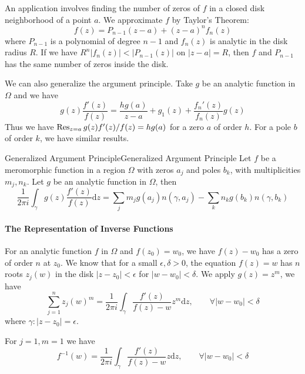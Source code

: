 \documentclass[../main.tex]{subfiles}
\begin{document}
An application involves finding the number of zeros of $f$ in a closed disk neighborhood of a point $a$. We approximate $f$ by Taylor's Theorem:
\begin{equation*}
	f(z) = P_{n-1}(z-a) + (z-a)^nf_n(z)
\end{equation*}
where $P_{n-1}$ is a polynomial of degree $n-1$ and $f_n(z)$ is analytic in the disk radius $R$. If we have $R^n \left|f_n(z)\right| < \left|P_{n-1}(z)\right|$ on $\left|z-a\right| = R$, then $f$ and $P_{n-1}$ has the same number of zeros inside the disk.

We can also generalize the argument principle. Take $g$ be an analytic function in $\Omega$ and we have
\begin{equation*}
	g(z) \frac{f'(z)}{f(z)} = \frac{hg(a)}{z-a} + g_1(z) + \frac{f_n'(z)}{f_n(z)}g(z)
\end{equation*}
Thus we have $\operatorname{Res}_{z=a} g(z) f'(z) / f(z) = hg(a)$ for a zero $a$ of order $h$. For a pole $b$ of order $k$, we have similar results.

\begin{theorem}{Generalized Argument Principle}{Generalized Argument Principle}
	Let $f$ be a meromorphic function in a region $\Omega$ with zeros $a_j$ and poles $b_k$, with multiplicities $m_j,n_k$. Let $g$ be an analytic function in $\Omega$, then
	\begin{equation}
		\frac{1}{2 \pi i} \int_{\gamma} g(z) \frac{f'(z)}{f(z)} \mathrm{d} z = \sum_{j} m_j g(a_j) n(\gamma,a_j) - \sum_{k} n_k g(b_k) n(\gamma,b_k)
	\end{equation}
\end{theorem}

\paragraph{The Representation of Inverse Functions}
For an analytic function $f$ in $\Omega$ and $f(z_0)=w_0$, we have $f(z)-w_0$ has a zero of order $n$ at $z_0$. We know that for a small $\epsilon,\delta>0$, the equation $f(z)=w$ has $n$ roots $z_j(w)$ in the disk $\left|z-z_0\right|<\epsilon$ for $\left|w-w_0\right|<\delta$. We apply $g(z)=z^m$, we have
\begin{equation}
	\sum_{j=1}^{n} z_j(w)^m = \frac{1}{2 \pi i} \int_{\gamma} \frac{f'(z)}{f(z)-w} z^m \mathrm{d} z, \qquad \forall \left|w-w_0\right|<\delta
\end{equation}
where $\gamma: \left|z-z_0\right| = \epsilon$.

For $j=1,m=1$ we have
\begin{equation}
	f^{-1}(w)  = \frac{1}{2 \pi i} \int_{\gamma} \frac{f'(z)}{f(z)-w} z \mathrm{d} z, \qquad \forall \left|w-w_0\right|<\delta
\end{equation}
\end{document}
